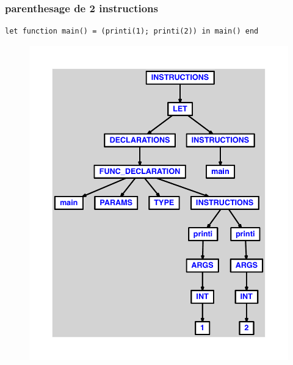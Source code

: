 \documentclass{article}
\begin{document}
\subsubsection{parenthesage de 2 instructions}
\begin{lstlisting}
let function main() = (printi(1); printi(2)) in main() end
\end{lstlisting}
\newpage
\begin{figure}[H]
\centering
\includegraphics[max width=\textwidth]{ast/ast_136.pdf}
\end{figure}
\newpage
\end{document}
